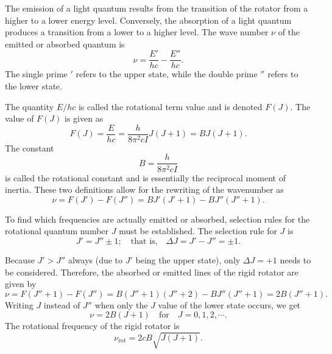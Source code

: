 \documentclass[11pt, twoside, fleqn]{report}
\newcommand{\up}{\text}
\begin{document}
The emission of a light quantum results from the transition of the rotator from a higher to a lower energy level. Conversely, the absorption of a light quantum produces a transition from a lower to a higher level. The wave number $\nu$ of the emitted or absorbed quantum is
\begin{equation*}
    \nu = \frac{E'}{hc} - \frac{E''}{hc}.
\end{equation*}
The single prime $'$ refers to the upper state, while the double prime $''$ refers to the lower state.

The quantity $E/hc$ is called the rotational term value and is denoted $F(J)$. The value of $F(J)$ is given as
\begin{equation*}
    F(J) = \frac{E}{hc} = \frac{h}{8\pi^2cI}J(J + 1) = BJ(J + 1).
\end{equation*}
The constant
\begin{equation*}
    B = \frac{h}{8\pi^2cI}
\end{equation*}
is called the rotational constant and is essentially the reciprocal moment of inertia. These two definitions allow for the rewriting of the wavenumber as
\begin{equation*}
    \nu = F(J')- F(J'') = BJ'(J' + 1) - BJ''(J'' + 1).
\end{equation*}

To find which frequencies are actually emitted or absorbed, selection rules for the rotational quantum number $J$ must be established. The selection rule for $J$ is
\begin{equation*}
    J' = J'' \pm 1; \quad\text{that is,}\quad \Delta{}J = J' - J'' = \pm 1.
\end{equation*}

Because $J' > J''$ always (due to $J'$ being the upper state), only $\Delta{}J = +1$ needs to be considered. Therefore, the absorbed or emitted lines of the rigid rotator are given by
\begin{equation*}
    \nu = F(J'' + 1) - F(J'') = B(J'' + 1)(J'' + 2) - BJ''(J'' + 1) = 2B(J'' + 1).
\end{equation*}
Writing $J$ instead of $J''$ when only the $J$ value of the lower state occurs, we get
\begin{equation*}
    \nu = 2B(J + 1) \quad\text{for}\quad J = 0, 1, 2, \dotsb.
\end{equation*}
The rotational frequency of the rigid rotator is
\begin{equation*}
    \nu_\up{rot} = 2cB\sqrt{J(J + 1)}.
\end{equation*}
\end{document}
